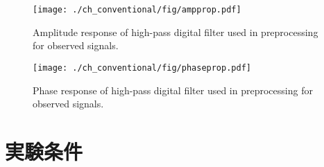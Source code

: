 \begin{figure}[!t]
\centering
\texttt{[image: ./ch\_conventional/fig/ampprop.pdf]}
\caption{Amplitude response of high-pass digital filter used in preprocessing for observed signals.}
\label{fig:ampres}
\end{figure}

\begin{figure}[!t]
\centering
\texttt{[image: ./ch\_conventional/fig/phaseprop.pdf]}
\caption{Phase response of high-pass digital filter used in preprocessing for observed signals.}
\label{fig:phaseres}
\end{figure}

\section{実験条件}
\label{sec:conv:expcond5}


